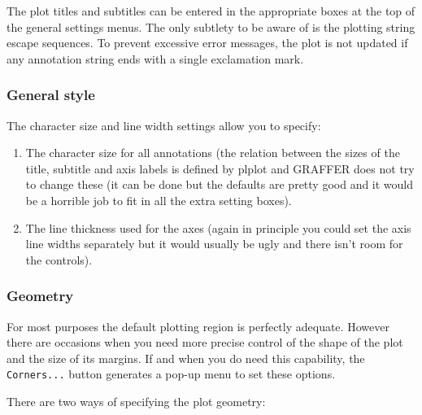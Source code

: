 \documentclass[11pt,twoside,english]{article}
\begin{document}
The plot titles and subtitles can be entered in the appropriate boxes
at the top of the general settings menus. The only subtlety to be aware
of is the plotting string escape sequences. To prevent excessive error
messages, the plot is not updated if any annotation string ends with a
single exclamation mark.


\subsubsection{General style}

The character size and line width settings allow you to specify:

\begin{enumerate}
\item The character size for all annotations (the relation between the
  sizes of the title, subtitle and axis labels is defined by plplot and
  GRAFFER does not try to change these (it can be done but the defaults
  are pretty good and it would be a horrible job to fit in all the
  extra setting boxes).
\item The line thickness used for the axes (again in principle you
  could set the axis line widths separately but it would usually be
  ugly and there isn't room for the controls).
\end{enumerate}

\subsubsection{Geometry}

For most purposes the default plotting region is perfectly
adequate. However there are occasions when you need more precise
control of the shape of the plot and the size of its margins. If and
when you do need this capability, the \texttt{Corners...} button
generates a pop-up menu to set these options.

There are two ways of specifying the plot geometry:
\end{document}
